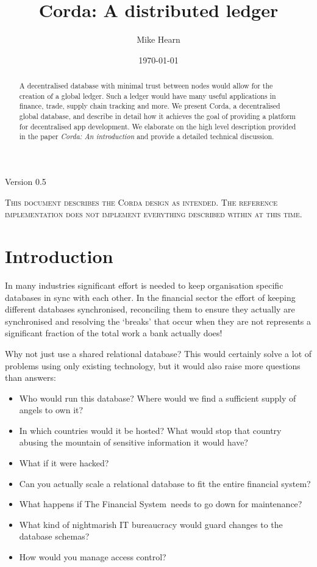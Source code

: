 \documentclass{article}
\author{Mike Hearn}
\date{\today}
\title{Corda: A distributed ledger}
\begin{document}
\maketitle
\begin{center}
Version 0.5
\end{center}

\vspace{10mm}

\begin{abstract}

A decentralised database with minimal trust between nodes would allow for the creation of a global ledger. Such a ledger
would have many useful applications in finance, trade, supply chain tracking and more. We present Corda, a decentralised
global database, and describe in detail how it achieves the goal of providing a platform for decentralised app
development. We elaborate on the high level description provided in the paper \emph{Corda: An
introduction}\cite{CordaIntro} and provide a detailed technical discussion.

\end{abstract}
\vfill
\begin{center}
\scriptsize{
\textsc{This document describes the Corda design as intended. The reference
implementation does not implement everything described within at this time.}
}
\end{center}
\newpage
\tableofcontents
\newpage
\section{Introduction}

In many industries significant effort is needed to keep organisation specific databases in sync with each
other. In the financial sector the effort of keeping different databases synchronised, reconciling them to ensure
they actually are synchronised and resolving the `breaks' that occur when they are not represents a significant
fraction of the total work a bank actually does!

Why not just use a shared relational database? This would certainly solve a lot of problems using only existing technology,
but it would also raise more questions than answers:

\begin{itemize}
\item Who would run this database? Where would we find a sufficient supply of angels to own it?
\item In which countries would it be hosted? What would stop that country abusing the mountain of sensitive information it would have?
\item What if it were hacked?
\item Can you actually scale a relational database to fit the entire financial system?
\item What happens if The Financial System\texttrademark~needs to go down for maintenance?
\item What kind of nightmarish IT bureaucracy would guard changes to the database schemas?
\item How would you manage access control?
\end{itemize}
\end{document}
